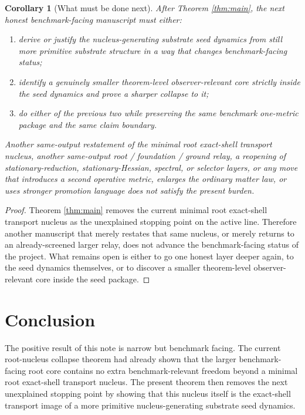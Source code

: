 \documentclass[11pt]{article}
\newtheorem{corollary}{Corollary}
\begin{document}
\begin{corollary}[What must be done next]
\label{cor:next}
After Theorem \ref{thm:main}, the next honest benchmark-facing manuscript must either:
\begin{enumerate}
    \item derive or justify the nucleus-generating substrate seed dynamics from still more primitive substrate structure in a way that changes benchmark-facing status;
    \item identify a genuinely smaller theorem-level observer-relevant core strictly inside the seed dynamics and prove a sharper collapse to it;
    \item do either of the previous two while preserving the same benchmark one-metric package and the same claim boundary.
\end{enumerate}
Another same-output restatement of the minimal root exact-shell transport nucleus, another same-output root / foundation / ground relay, a reopening of stationary-reduction, stationary-Hessian, spectral, or selector layers, or any move that introduces a second operative metric, enlarges the ordinary matter law, or uses stronger promotion language does not satisfy the present burden.
\end{corollary}

\begin{proof}
Theorem \ref{thm:main} removes the current minimal root exact-shell transport nucleus as the unexplained stopping point on the active line. Therefore another manuscript that merely restates that same nucleus, or merely returns to an already-screened larger relay, does not advance the benchmark-facing status of the project. What remains open is either to go one honest layer deeper again, to the seed dynamics themselves, or to discover a smaller theorem-level observer-relevant core inside the seed package.
\end{proof}

\section{Conclusion}

The positive result of this note is narrow but benchmark facing. The current root-nucleus collapse theorem had already shown that the larger benchmark-facing root core contains no extra benchmark-relevant freedom beyond a minimal root exact-shell transport nucleus. The present theorem then removes the next unexplained stopping point by showing that this nucleus itself is the exact-shell transport image of a more primitive nucleus-generating substrate seed dynamics.
\end{document}
